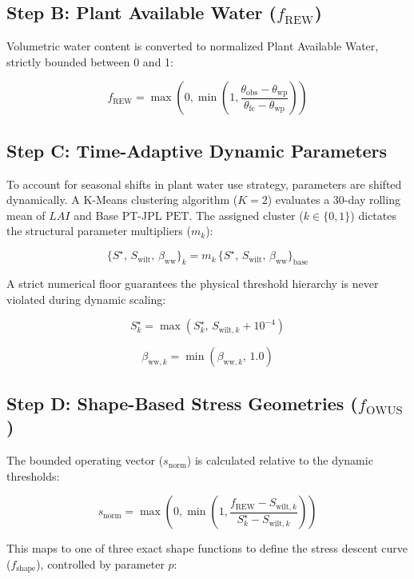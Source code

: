 \documentclass[11pt]{article}
\begin{document}
\subsection*{Step B: Plant Available Water ($f_{\mathrm{REW}}$)}

Volumetric water content is converted to normalized Plant Available Water, strictly bounded between 0 and 1:


$$f_{\mathrm{REW}} = \max\left(0, \min\left(1, \frac{\theta_{\mathrm{obs}} - \theta_{\mathrm{wp}}}{\theta_{\mathrm{fc}} - \theta_{\mathrm{wp}}}\right)\right)$$

\subsection*{Step C: Time-Adaptive Dynamic Parameters}

To account for seasonal shifts in plant water use strategy, parameters are shifted dynamically. A K-Means clustering algorithm ($K=2$) evaluates a 30-day rolling mean of $LAI$ and Base PT-JPL $\mathrm{PET}$. The assigned cluster ($k \in \{0, 1\}$) dictates the structural parameter multipliers ($m_k$):


$$\{S^\star,\,S_{\mathrm{wilt}},\,\beta_{\mathrm{ww}}\}_{k} = m_{k}\,\{S^\star,\,S_{\mathrm{wilt}},\,\beta_{\mathrm{ww}}\}_{\mathrm{base}}$$

A strict numerical floor guarantees the physical threshold hierarchy is never violated during dynamic scaling:


$$S^\star_{k} = \max\left(S^\star_{k},\, S_{\mathrm{wilt},k} + 10^{-4}\right)$$

$$\beta_{\mathrm{ww},k} = \min\left(\beta_{\mathrm{ww},k},\, 1.0\right)$$

\subsection*{Step D: Shape-Based Stress Geometries ($f_{\mathrm{OWUS}}$)}

The bounded operating vector ($s_{\mathrm{norm}}$) is calculated relative to the dynamic thresholds:


$$s_{\mathrm{norm}} = \max\left(0, \min\left(1, \frac{f_{\mathrm{REW}} - S_{\mathrm{wilt},k}}{S^\star_{k} - S_{\mathrm{wilt},k}}\right)\right)$$

This maps to one of three exact shape functions to define the stress descent curve ($f_{\mathrm{shape}}$), controlled by parameter $p$:
\end{document}
